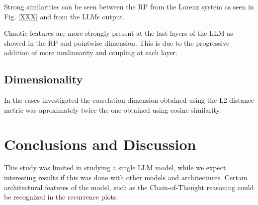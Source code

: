 \documentclass[a4paper,12pt]{article}
\begin{document}
Strong similarities can be seen between the RP from the Lorenz \cite{DeterministicNonperiodicFlow} system as seen in Fig. \ref{XXX} and from the LLMs output.


Chaotic features are more strongly present at the last layers of the LLM as showed in the RP and pointwise dimension. This is due to the progressive addition of more nonlinearity and coupling at each layer. 


\subsection{Dimensionality}



In the cases investigated the correlation dimension obtained using the L2 distance metric was aproximately twice the one obtained using cosine similarity.


\section{Conclusions and Discussion}



This study was limited in studying a single LLM model, while we expect interesting results if this was done with other models and architectures. Certain architectural features of the model, such as the Chain-of-Thought reasoning could be recognized in the recurrence plots.
\end{document}
